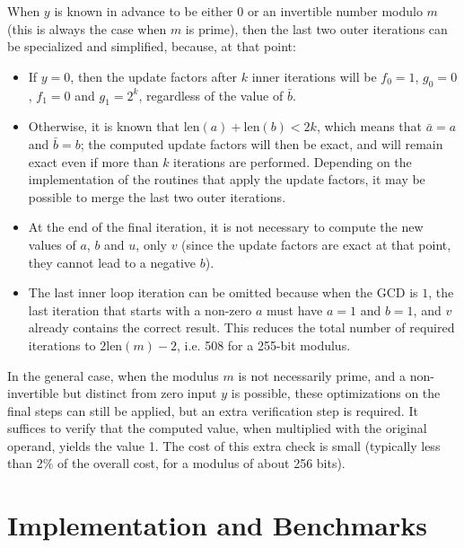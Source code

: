\documentclass{llncs}
\newcommand{\bitlength}{\text{len}}
\begin{document}
When $y$ is known in advance to be either 0 or an invertible number
modulo $m$ (this is always the case when $m$ is prime), then the last
two outer iterations can be specialized and simplified, because, at
that point:
\begin{itemize}

    \item If $y = 0$, then the update factors after $k$ inner
    iterations will be $f_0 = 1$, $g_0 = 0$, $f_1 = 0$ and $g_1 = 2^k$,
    regardless of the value of $\bar b$.

    \item Otherwise, it is known that $\bitlength(a) + \bitlength(b) <
    2k$, which means that $\bar a = a$ and $\bar b = b$; the computed
    update factors will then be exact, and will remain exact even if
    more than $k$ iterations are performed. Depending on the
    implementation of the routines that apply the update factors, it may
    be possible to merge the last two outer iterations.

    \item At the end of the final iteration, it is not necessary to
    compute the new values of $a$, $b$ and $u$, only $v$ (since the
    update factors are exact at that point, they cannot lead to a
    negative $b$).

    \item The last inner loop iteration can be omitted because when the
    GCD is $1$, the last iteration that starts with a non-zero $a$ must
    have $a = 1$ and $b = 1$, and $v$ already contains the correct
    result. This reduces the total number of required iterations to
    $2\bitlength(m) - 2$, i.e. 508 for a 255-bit modulus.

\end{itemize}

In the general case, when the modulus $m$ is not necessarily prime, and
a non-invertible but distinct from zero input $y$ is possible, these
optimizations on the final steps can still be applied, but an extra
verification step is required. It suffices to verify that the computed
value, when multiplied with the original operand, yields the value 1.
The cost of this extra check is small (typically less than 2\% of the
overall cost, for a modulus of about 256 bits).

\section{Implementation and Benchmarks}
\end{document}
